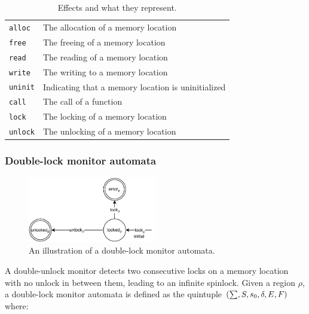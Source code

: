 \begin{table}[H]
    \centering
    \begin{tabular}{ll}
        \texttt{alloc}  & The allocation of a memory location                   \\
        \texttt{free}   & The freeing of a memory location                      \\
        \texttt{read}   & The reading of a memory location                      \\
        \texttt{write}  & The writing to a memory location                      \\
        \texttt{uninit} & Indicating that a memory location is uninitialized    \\
        \texttt{call}   & The call of a function                                \\
        \texttt{lock}   & The locking of a memory location                      \\
        \texttt{unlock} & The unlocking of a memory location    
    \end{tabular}
    \caption{Effects and what they represent.}
    \label{effect-table}
\end{table}

\subsubsection*{Double-lock monitor automata}

\begin{figure}[H]
    \centering
    \includegraphics[width=0.5\textwidth]{algorithm/figures/double-lock-short}
    \caption{An illustration of a double-lock monitor automata.}
    \label{double-lock-automata-short}
\end{figure}

A double-unlock monitor detects two consecutive locks on a memory location with no unlock in between them, leading to an infinite spinlock. Given a region $\rho$, a double-lock monitor automata is defined as the quintuple $(\sum, S, s_0, \delta, E, \\F)$ where: 

